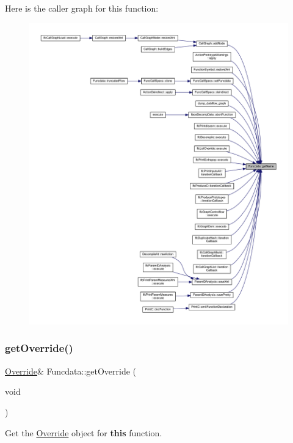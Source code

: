 Here is the caller graph for this function\+:
\nopagebreak
\begin{figure}[H]
\begin{center}
\leavevmode
\includegraphics[width=350pt]{class_funcdata_a8c6ed264ff7e018a4948045186e4af1f_icgraph}
\end{center}
\end{figure}
\mbox{\label{class_funcdata_ac48d087ed5fbf901cfa608d8f44b6d5c}} 
\subsubsection{\texorpdfstring{getOverride()}{getOverride()}}
{\footnotesize\ttfamily \mbox{\hyperlink{class_override}{Override}}\& Funcdata\+::get\+Override (\begin{DoxyParamCaption}\item[{void}]{ }\end{DoxyParamCaption})\hspace{0.3cm}{\ttfamily [inline]}}



Get the \mbox{\hyperlink{class_override}{Override}} object for {\bfseries{this}} function. 



